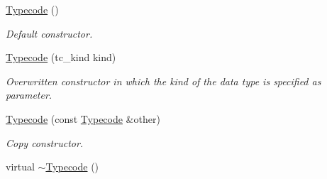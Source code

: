 \begin{DoxyCompactItemize}
\item 
\hyperlink{class_dynamic_fast_buffers_1_1_typecode_a052c78c4625608566e280e3decfc1b80}{Typecode} ()
\begin{DoxyCompactList}\small\item\em Default constructor. \end{DoxyCompactList}\item 
\hyperlink{class_dynamic_fast_buffers_1_1_typecode_a4f184ee4396b450dbeb5b39f40fa382d}{Typecode} (tc\-\_\-kind kind)
\begin{DoxyCompactList}\small\item\em Overwritten constructor in which the kind of the data type is specified as parameter. \end{DoxyCompactList}\item 
\hyperlink{class_dynamic_fast_buffers_1_1_typecode_af3df3f5ed7746f2d1f9073ac36f2f7df}{Typecode} (const \hyperlink{class_dynamic_fast_buffers_1_1_typecode}{Typecode} \&other)
\begin{DoxyCompactList}\small\item\em Copy constructor. \end{DoxyCompactList}\item 
\hypertarget{class_dynamic_fast_buffers_1_1_typecode_abffa89695a9e9bccb510b9d25320e8b7}{virtual \hyperlink{class_dynamic_fast_buffers_1_1_typecode_abffa89695a9e9bccb510b9d25320e8b7}{$\sim$\-Typecode} ()}\label{class_dynamic_fast_buffers_1_1_typecode_abffa89695a9e9bccb510b9d25320e8b7}


\end{DoxyCompactItemize}
